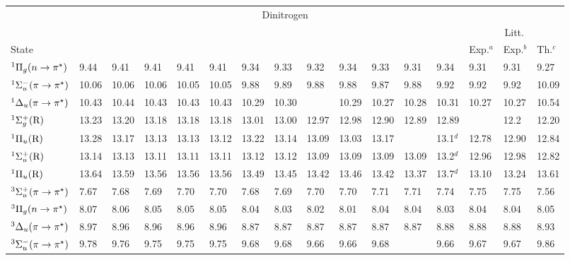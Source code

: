   \begin{tabular}{l|p{.6cm}p{1.1cm}p{1.4cm}p{1.7cm}p{.9cm}|p{.6cm}p{1.1cm}p{1.4cm}p{.9cm}|p{.6cm}p{1.1cm}p{.9cm}|p{.7cm}p{.7cm}p{.7cm}}
 
		 \multicolumn{16}{c}{Dinitrogen}\\
		& \multicolumn{5}{c}{\AVDZ} & \multicolumn{4}{c}{\AVTZ}& \multicolumn{3}{c}{\AVQZ} & \multicolumn{3}{c}{Litt.}\\
State 	& {\CC{3}} & {\CCSDT} & {\CCSDTQ} & {\CCSDTQP} & {\exCI} & {\CC{3}} & {\CCSDT} & {\CCSDTQ}  & {\exCI}& {\CC{3}} & {\CCSDT}   & {\exCI} & Exp.$^a$ &  Exp.$^b$ & Th.$^c$\\
$^1\Pi_g (n \rightarrow \pi^\star)$ 				&9.44	&9.41  &	9.41	&9.41 &	9.41		&9.34 &9.33 	&9.32	&9.34	&9.33 	&9.31	&9.34	&9.31	&9.31	&9.27	\\
$^1\Sigma_u^- (\pi \rightarrow \pi^\star)$			&10.06	&10.06&	10.06&10.05&	10.05	&9.88 &9.89 	&9.88	&9.88	&9.87 	&9.88	&9.92	&9.92	&9.92	&10.09	\\
$^1\Delta_u (\pi \rightarrow \pi^\star)$ 			&10.43	&10.44&	10.43&10.43&	10.43	&10.29&10.30 	&		&10.29	&10.27 	&10.28	&10.31	&10.27	&10.27	&10.54	\\
$^1\Sigma_g^+ (\mathrm{R})$ 					&13.23	&13.20&	13.18&13.18&	13.18	&13.01&13.00	&12.97	&12.98	&12.90 	&12.89	&12.89	&		&12.2	&12.20	\\
$^1\Pi_u (\mathrm{R})$ 						&13.28	&13.17&	13.13&13.13&	13.12	&13.22&13.14	&13.09	&13.03	&13.17 	&		&13.1$^d$&12.78	&12.90	&12.84	\\
$^1\Sigma_u^+ (\mathrm{R})$ 					&13.14	&13.13&	13.11&13.11&	13.11	&13.12&13.12	&13.09	&13.09	&13.09 	&13.09	&13.2$^d$&12.96	&12.98	&12.82	\\
$^1\Pi_u (\mathrm{R})$ 						&13.64	&13.59&	13.56&13.56&	13.56	&13.49&13.45	&13.42	&13.46	&13.42 	&13.37	&13.7$^d$&13.10	&13.24	&13.61	\\
$^3\Sigma_u^+ (\pi \rightarrow \pi^\star)$			&7.67	&7.68&	7.69	&7.70 &	7.70		&7.68 &7.69	&7.70	&7.70	&7.71 	&7.71	&7.74	&7.75	&7.75	&7.56	\\
$^3\Pi_g (n \rightarrow \pi^\star)$ 				&8.07	&8.06&	8.05 &8.05 &	8.05		&8.04 &8.03	&8.02	&8.01	&8.04 	&8.04	&8.03	&8.04	&8.04	&8.05	\\
$^3\Delta_u (\pi \rightarrow \pi^\star)$ 			&8.97	&8.96&	8.96 &8.96 &	8.96		&8.87 &8.87	&8.87	&8.87	&8.87 	&8.87	&8.88	&8.88	&8.88	&8.93	\\
$^3\Sigma_u^- (\pi \rightarrow \pi^\star)$			&9.78	&9.76&	9.75 &9.75&	9.75		&9.68 &9.68	&9.66	&9.66	&9.68 	&		&9.66	&9.67	&9.67	&9.86	\\
 \end{tabular}